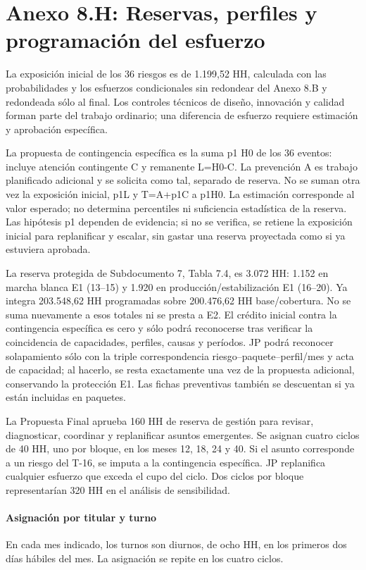 \clearpage
\section{Anexo 8.H: Reservas, perfiles y programación del esfuerzo}
\label{sec:cierre-reservas}
La exposición inicial de los 36 riesgos es de 1.199,52 HH, calculada con las probabilidades y los esfuerzos condicionales sin redondear del Anexo 8.B y redondeada sólo al final. Los controles técnicos de diseño, innovación y calidad forman parte del trabajo ordinario; una diferencia de esfuerzo requiere estimación y aprobación específica.

La propuesta de contingencia específica es la suma p1 H0 de los 36 eventos: incluye atención contingente C y remanente L=H0-C. La prevención A es trabajo planificado adicional y se solicita como tal, separado de reserva. No se suman otra vez la exposición inicial, p1L y T=A+p1C a p1H0. La estimación corresponde al valor esperado; no determina percentiles ni suficiencia estadística de la reserva. Las hipótesis p1 dependen de evidencia; si no se verifica, se retiene la exposición inicial para replanificar y escalar, sin gastar una reserva proyectada como si ya estuviera aprobada.

La reserva protegida de Subdocumento 7, Tabla 7.4, es 3.072 HH: 1.152 en marcha blanca E1 (13--15) y 1.920 en producción/estabilización E1 (16--20). Ya integra 203.548,62 HH programadas sobre 200.476,62 HH base/cobertura. No se suma nuevamente a esos totales ni se presta a E2. El crédito inicial contra la contingencia específica es cero y sólo podrá reconocerse tras verificar la coincidencia de capacidades, perfiles, causas y períodos. JP podrá reconocer solapamiento sólo con la triple correspondencia riesgo--paquete--perfil/mes y acta de capacidad; al hacerlo, se resta exactamente una vez de la propuesta adicional, conservando la protección E1. Las fichas preventivas también se descuentan si ya están incluidas en paquetes.

La Propuesta Final aprueba 160 HH de reserva de gestión para revisar, diagnosticar, coordinar y replanificar asuntos emergentes. Se asignan cuatro ciclos de 40 HH, uno por bloque, en los meses 12, 18, 24 y 40. Si el asunto corresponde a un riesgo del T-16, se imputa a la contingencia específica. JP replanifica cualquier esfuerzo que exceda el cupo del ciclo. Dos ciclos por bloque representarían 320 HH en el análisis de sensibilidad.

\paragraph{Asignación por titular y turno}
En cada mes indicado, los turnos son diurnos, de ocho HH, en los primeros dos días hábiles del mes. La asignación se repite en los cuatro ciclos.

